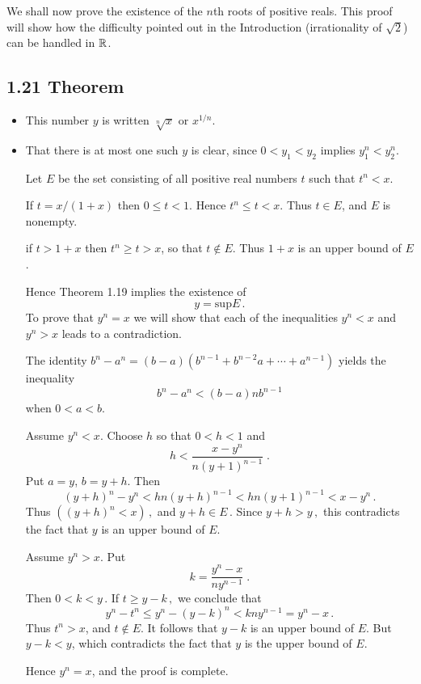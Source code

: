 We shall now prove the existence of the $n$th roots of positive reals. This proof will show how the difficulty pointed out in the Introduction (irrationality of $\sqrt{2}$) can be handled in $\mathbb{R}$.

\subsection*{1.21 Theorem}
\begin{itemize}
\item[] This number $y$ is written $\sqrt[n]{x}$ or $x^{1/n}$.
\item[] That there is at most one such $y$ is clear, since $0 < y_1 < y_2$  implies $y_1^n < y_2^n$.

Let $E$ be the set consisting of all positive real numbers $t$ such that $t^n < x.$

If $t = x / (1 + x)$ then $0 \leq t < 1$. Hence $t^n \leq t < x$. Thus $t \in E$, and $E$ is nonempty.

if $t > 1 + x$ then $t^n \geq t > x$, so that $t \notin E$. Thus $1 + x$ is an upper bound of $E$. 

Hence Theorem 1.19 implies the existence of $$y = \text{sup} E\,.$$ 
To prove that $y^n = x$ we will show that each of the inequalities $y^n < x$ and $y^n > x$ leads to a contradiction.

The identity $b^n - a^n = (b-a)(b^{n-1} + b^{n-2}a + \cdots + a^{n-1})$ yields the inequality
$$ b^n - a^n < (b - a) n  b^{n-1}$$ when $0 < a < b$. 

Assume $y^n < x$. Choose $h$ so that $0 < h < 1$ and $$h < \frac{x - y^n}{n {(y + 1)}^{n - 1}}\;. $$
Put $a = y$, $b = y + h$. Then 
$${(y + h)}^n - y^n < hn {(y + h)}^{n - 1} < hn {(y + 1)}^{n - 1} < x - y^n\,.$$
Thus $({(y + h)}^n < x)\,,$ and $y + h \in E\,.$ Since $y + h > y\,,$ this contradicts the fact that $y$ is an upper bound of $E$. 

Assume $y^n > x$. Put  $$k = \frac{y^n - x}{n y^{n - 1}}\;. $$
Then $0 < k < y\,.$ If $t \geq y - k\,,$ we conclude that 
$$y^n - t^n \leq y^n - {(y - k)}^n < k n y^{n - 1} = y^n - x\,.$$ 
Thus $t^n > x$, and $t \notin E$. It follows that $y - k$ is an upper bound of $E$. 
But $y - k < y$, which contradicts the fact that $y$ is the  upper bound of $E$.

Hence $y^n = x$, and the proof is complete.   
\end{itemize}

